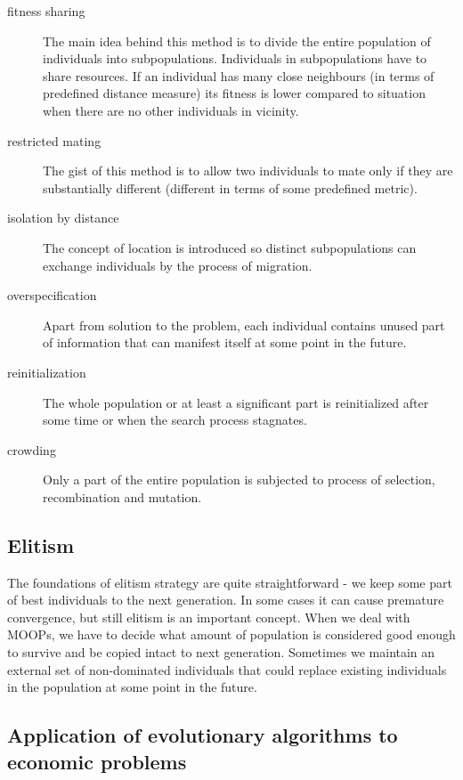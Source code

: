 \begin{description}
  \item [fitness sharing]
	The main idea behind this method is to divide the entire population of individuals into subpopulations.
	Individuals in subpopulations have to share resources.
	If an individual has many close neighbours (in terms of predefined distance measure) its fitness is lower compared to situation when there are
	no other individuals in vicinity. 
	
  \item [restricted mating]
	The gist of this method is to allow two individuals to mate only if they are substantially different (different in terms of some predefined metric).
  \item [isolation by distance]
	The concept of location is introduced so distinct subpopulations can exchange individuals by the process of migration. 
  \item [overspecification]
	Apart from solution to the problem, each individual contains unused part of information that can manifest itself at some point in the future.
  \item [reinitialization]
	The whole population or at least a significant part is reinitialized after some time or when the search process stagnates.
  \item [crowding]
	Only a part of the entire population is subjected to process of selection, recombination and mutation. 
\end{description}


\subsection{Elitism}

The foundations of elitism strategy are quite straightforward - we keep some part of best individuals to the next generation.
In some cases it can cause premature convergence, but still elitism is an important concept.
When we deal with MOOPs, we have to decide what amount of population is considered good enough to survive and be copied intact to next generation.
Sometimes we maintain an external set of non-dominated individuals that could replace existing individuals in the population at some point in the future.
   
\subsection{Application of evolutionary algorithms to economic problems}

